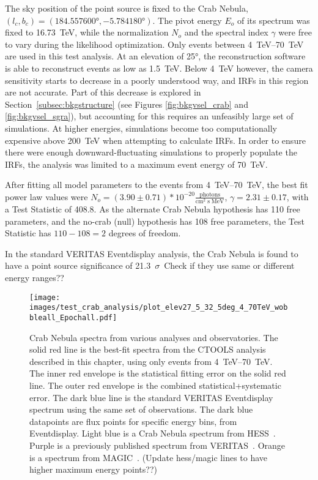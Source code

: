   The sky position of the point source is fixed to the Crab Nebula, $(l_c,b_c) = (\ang{184.557600},\ang{-5.784180})$.
  The pivot energy $E_o$ of its spectrum was fixed to \SI{16.73}{TeV}, while the normalization $N_o$ and the spectral index $\gamma$ were free to vary during the likelihood optimization.
  Only events between \SIrange{4}{70}{TeV} are used in this test analysis.
  At an elevation of \ang{25}, the reconstruction software is able to reconstruct events as low as \SI{1.5}{TeV}.
  Below \SI{4}{TeV} however, the camera sensitivity starts to decrease in a poorly understood way, and IRFs in this region are not accurate.
  Part of this decrease is explored in Section~\ref{subsec:bkgstructure} (see Figures \ref{fig:bkgvsel_crab} and \ref{fig:bkgvsel_sgra}), but accounting for this requires an unfeasibly large set of simulations.
  At higher energies, simulations become too computationally expensive above \SI{200}{TeV} when attempting to calculate IRFs.
  In order to ensure there were enough downward-fluctuating simulations to properly populate the IRFs, the analysis was limited to a maximum event energy of \SI{70}{TeV}.
    
  After fitting all model parameters to the events from \SIrange{4}{70}{TeV}, the best fit power law values were $ N_o = \left(3.90\pm0.71\right)*10^{-20} \frac{\textrm{photons}}{\textrm{cm}^{2} \; \textrm{s} \; \textrm{MeV} } $, $ \gamma = 2.31 \pm 0.17 $, with a Test Statistic of 408.8.
  As the alternate Crab Nebula hypothesis has 110 free parameters, and the no-crab (null) hypothesis has 108 free parameters, the Test Statistic has $ 110 - 108 = 2 $ degrees of freedom.
  
  In the standard VERITAS Eventdisplay analysis, the Crab Nebula is found to have a point source significance of \SI{21.3}{$\sigma$}.
  {\color{red}Check if they use same or different energy ranges??}
    
    
  \begin{figure}[h]
    \centering
    \texttt{[image: images/test\_crab\_analysis/plot\_elev27\_5\_32\_5deg\_4\_70TeV\_wobbleall\_Epochall.pdf]}
    \caption[Crab Test Spectrum]
    {
      Crab Nebula spectra from various analyses and observatories.
      The solid red line is the best-fit spectra from the CTOOLS analysis described in this chapter, using only events from \SIrange{4}{70}{TeV}.
      The inner red envelope is the statistical fitting error on the solid red line.
      The outer red envelope is the combined statistical+systematic error.
      The dark blue line is the standard VERITAS Eventdisplay spectrum using the same set of observations.
      The dark blue datapoints are flux points for specific energy bins, from Eventdisplay.
      Light blue is a Crab Nebula spectrum from HESS~\cite{hess2006crab}.
      Purple is a previously published spectrum from VERITAS~\cite{veritas2015crab}.
      Orange is a spectrum from MAGIC~\cite{magic2015crab}.
      {\color{red}(Update hess/magic lines to have higher maximum energy points??)}
    }
    \label{fig:crab_test_spectra}
  \end{figure}
    
